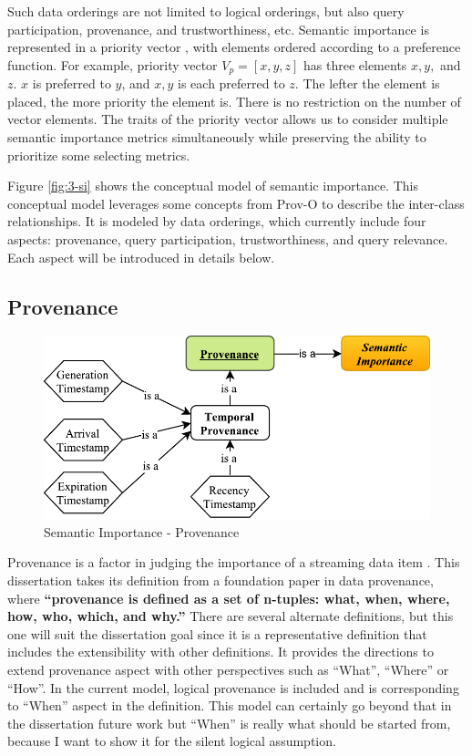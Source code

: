 Such data orderings are not limited to logical orderings, but also query participation, provenance, and trustworthiness, etc. 
Semantic importance is represented in a priority vector \cite{saaty2003decision}, with elements ordered according to a preference function.
For example, priority vector $V_{p} = [x, y, z]$ has three elements $x, y,$ and $z$.
$x$ is preferred to $y$, and $x, y$ is each preferred to $z$.
The lefter the element is placed, the more priority the element is.  
There is no restriction on the number of vector elements. 
The traits of the priority vector allows us to consider multiple semantic importance metrics simultaneously while preserving the ability to prioritize some selecting metrics. 

Figure \ref{fig:3-si} shows the conceptual model of semantic importance. 
This conceptual model leverages some concepts from Prov-O \cite{lebo2013prov} to describe the inter-class relationships. 
It is modeled by data orderings, which currently include four aspects: provenance, query participation, trustworthiness, and query relevance.
Each aspect will be introduced in details below.
%
\subsection{Provenance}

\begin{figure}[!htbp]
	\centering
    \includegraphics[width=5in]{img/3-sip.pdf}
    \caption{Semantic Importance - Provenance}
    \label{fig:3-sip}
\end{figure}

Provenance is a factor in judging the importance of a streaming data item \cite{gao2010survey}.
This dissertation takes its definition from a foundation paper \cite{ram2009new} in data provenance, 
where \textbf{``provenance is defined as a set of n-tuples: what, when, where, how, who, which, and why.''}
There are several alternate definitions, but this one will suit the dissertation goal since it is a representative definition that includes the extensibility with other definitions. 
It provides the directions to extend provenance aspect with other perspectives such as ``What'', ``Where'' or ``How''. 
In the current model, logical provenance is included and is corresponding to ``When'' aspect in the definition.
This model can certainly go beyond that in the dissertation future work but ``When'' is really what should be started from, because I want to show it for the silent logical assumption.

